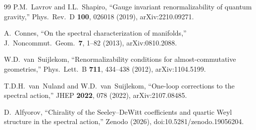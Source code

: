\documentclass[11pt,a4paper]{article}
\begin{document}
\begin{thebibliography}{99}
P.M.~Lavrov and I.L.~Shapiro,
``Gauge invariant renormalizability of quantum gravity,''
Phys.\ Rev.\ D \textbf{100}, 026018 (2019),
arXiv:2210.09271.

A.~Connes,
``On the spectral characterization of manifolds,''
J.~Noncommut.\ Geom.\ \textbf{7}, 1--82 (2013),
arXiv:0810.2088.

W.D.~van~Suijlekom,
``Renormalizability conditions for almost-commutative
geometries,''
Phys.\ Lett.\ B \textbf{711}, 434--438 (2012),
arXiv:1104.5199.

T.D.H.~van~Nuland and W.D.~van~Suijlekom,
``One-loop corrections to the spectral action,''
JHEP \textbf{2022}, 078 (2022),
arXiv:2107.08485.

D.~Alfyorov,
``Chirality of the Seeley--DeWitt coefficients and quartic Weyl
structure in the spectral action,''
Zenodo (2026), doi:10.5281/zenodo.19056204.

\end{thebibliography}
\end{document}
